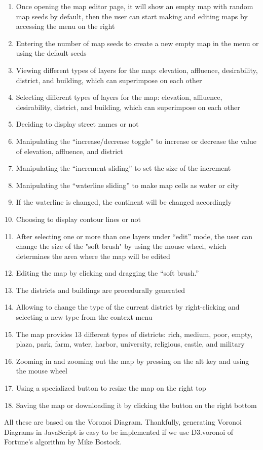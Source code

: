 \begin{enumerate}
  \item Once opening the map editor page, it will show an empty map with random map seeds by default, then the user can start making and editing maps by accessing the menu on the right
  \item Entering the number of map seeds to create a new empty map in the menu or using the default seeds
  \item Viewing different types of layers for the map: elevation, affluence, desirability, district, and building, which can superimpose on each other
  \item Selecting different types of layers for the map: elevation, affluence, desirability, district, and building, which can superimpose on each other
  \item Deciding to display street names or not
  \item Manipulating the ``increase/decrease toggle'' to increase or decrease the value of elevation, affluence, and district
  \item Manipulating the ``increment sliding'' to set the size of the increment
  \item Manipulating the ``waterline sliding'' to make map cells as water or city
  \item If the waterline is changed, the continent will be changed accordingly
  \item Choosing to display contour lines or not
  \item After selecting one or more than one layers under ``edit'' mode, the user can change the size of the "soft brush" by using the mouse wheel, which determines the area where the map will be edited
  \item Editing the map by clicking and dragging the ``soft brush.''
  \item The districts and buildings are procedurally generated
  \item Allowing to change the type of the current district by right-clicking and selecting a new type from the context menu
  \item The map provides 13 different types of districts: rich, medium, poor, empty, plaza, park, farm, water, harbor, university, religious, castle, and military
  \item Zooming in and zooming out the map by pressing on the alt key and using the mouse wheel
  \item Using a specialized button to resize the map on the right top
  \item Saving the map or downloading it by clicking the button on the right bottom
\end{enumerate}

All these are based on the Voronoi Diagram. Thankfully, generating Voronoi Diagrams in JavaScript is easy to be implemented if we use D3.voronoi of Fortune’s algorithm by Mike Bostock.

